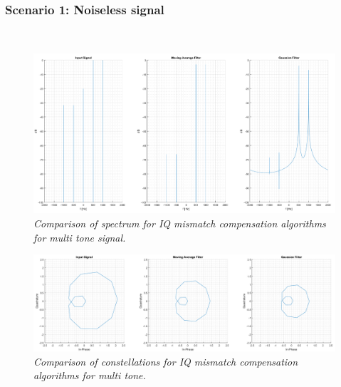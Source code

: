 \documentclass[en,printmode]{mgr}
\begin{document}
		\subsubsection*{Scenario 1: Noiseless signal}\
			\begin{figure}[!htb]
    			\centering
   				\includegraphics[width=\textwidth]{plots/multi_f.png}
   		 		\caption{\textit{Comparison of spectrum for IQ mismatch compensation algorithms 
   		 		for multi tone signal.}}
   		 	\end{figure}	
   		 	\begin{figure}[!htb]
    			\centering
   				\includegraphics[width=\textwidth]{plots/multi_c.png}
   		 		\caption{\textit{Comparison of constellations for IQ mismatch compensation algorithms
   		 		for multi tone.}}
   		 	\end{figure}		
\end{document}

